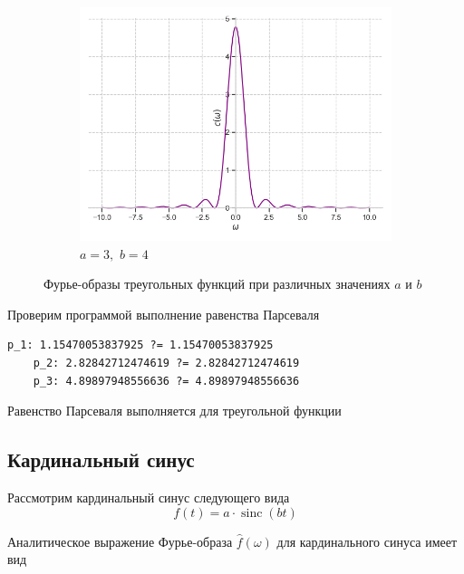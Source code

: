 \documentclass[a4paper, 16pt]{article}
\DeclareMathOperator{\sinc}{sinc}
\begin{document}
\begin{figure}[htbp]
\begin{subfigure}{0.3\textwidth}
            \centering
            \includegraphics[width=\linewidth]{trifimg_a=3_b=4.png}
            \caption{$a=3,\,\,b=4$}
            \label{fig:trifimg_3}
        \end{subfigure}
        \caption{Фурье-образы треугольных функций при различных значениях $a$ и $b$}
        \label{fig:trifimgs}
    \end{figure}




    \noindent Проверим программой выполнение равенства Парсеваля
    \begin{lstlisting}[label=parstrif, caption=Равенство Парсеваля для треугольных функций]
    p_1: 1.15470053837925 ?= 1.15470053837925
    p_2: 2.82842712474619 ?= 2.82842712474619
    p_3: 4.89897948556636 ?= 4.89897948556636
    \end{lstlisting}


    \noindent Равенство Парсеваля выполняется для треугольной функции


    \subsection{Кардинальный синус}
    \noindent Рассмотрим кардинальный синус следующего вида
    $$
    f(t)=a\cdot \sinc{(bt)}
    $$


    \noindent Аналитическое выражение Фурье-образа $\hat{f}(\omega)$ для кардинального синуса
    имеет вид
\end{document}
